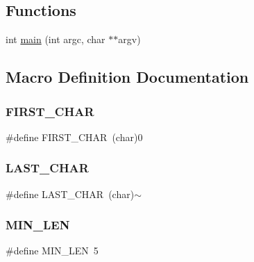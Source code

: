 \subsection*{Functions}
\begin{DoxyCompactItemize}
\item 
int \mbox{\hyperlink{adat-devel_2other__libs_2filedb_2filehash_2createStrings_8c_a3c04138a5bfe5d72780bb7e82a18e627}{main}} (int argc, char $\ast$$\ast$argv)
\end{DoxyCompactItemize}


\subsection{Macro Definition Documentation}
\mbox{\label{adat-devel_2other__libs_2filedb_2filehash_2createStrings_8c_af1c5fd90d1b8a22169133f549223f2e1}} 
\subsubsection{\texorpdfstring{FIRST\_CHAR}{FIRST\_CHAR}}
{\footnotesize\ttfamily \#define F\+I\+R\+S\+T\+\_\+\+C\+H\+AR~(char)\textquotesingle{}0\textquotesingle{}}

\mbox{\label{adat-devel_2other__libs_2filedb_2filehash_2createStrings_8c_a31911f021a0d09eed9a5269d0648dfde}} 
\subsubsection{\texorpdfstring{LAST\_CHAR}{LAST\_CHAR}}
{\footnotesize\ttfamily \#define L\+A\+S\+T\+\_\+\+C\+H\+AR~(char)\textquotesingle{}$\sim$\textquotesingle{}}

\mbox{\label{adat-devel_2other__libs_2filedb_2filehash_2createStrings_8c_aa69f8dba9add1a52ce3cf7bcfafcfda0}} 
\subsubsection{\texorpdfstring{MIN\_LEN}{MIN\_LEN}}
{\footnotesize\ttfamily \#define M\+I\+N\+\_\+\+L\+EN~5}

